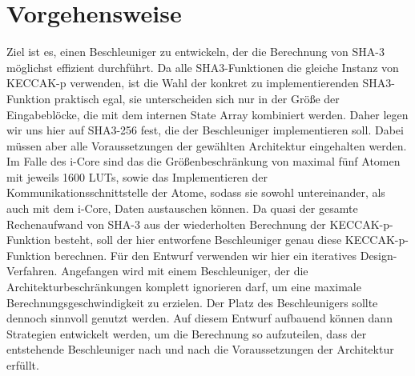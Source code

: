 \section{Vorgehensweise}
Ziel ist es, einen Beschleuniger zu entwickeln, der die Berechnung von SHA-3 möglichst effizient durchführt.
Da alle SHA3-Funktionen die gleiche Instanz von KECCAK-p verwenden, ist die Wahl der konkret zu implementierenden
SHA3-Funktion praktisch egal, sie unterscheiden sich nur in der Größe der Eingabeblöcke, die mit dem internen
State Array kombiniert werden. Daher legen wir uns hier auf SHA3-256 fest, die der Beschleuniger implementieren soll.
Dabei müssen aber alle Voraussetzungen der gewählten Architektur eingehalten werden. Im Falle des i-Core sind
das die Größenbeschränkung von maximal fünf Atomen mit jeweils 1600 LUTs, sowie das Implementieren der
Kommunikationsschnittstelle der Atome, sodass sie sowohl untereinander, als auch mit dem i-Core, Daten austauschen können.
Da quasi der gesamte Rechenaufwand von SHA-3 aus der wiederholten Berechnung der KECCAK-p-Funktion besteht,
soll der hier entworfene Beschleuniger genau diese KECCAK-p-Funktion berechnen.
Für den Entwurf verwenden wir hier ein iteratives Design-Verfahren. Angefangen wird mit einem Beschleuniger,
der die Architekturbeschränkungen komplett ignorieren darf, um eine maximale Berechnungsgeschwindigkeit zu erzielen.
Der Platz des Beschleunigers sollte dennoch sinnvoll genutzt werden. Auf diesem Entwurf aufbauend können dann
Strategien entwickelt werden, um die Berechnung so aufzuteilen, dass der entstehende Beschleuniger nach und nach die
Voraussetzungen der Architektur erfüllt.